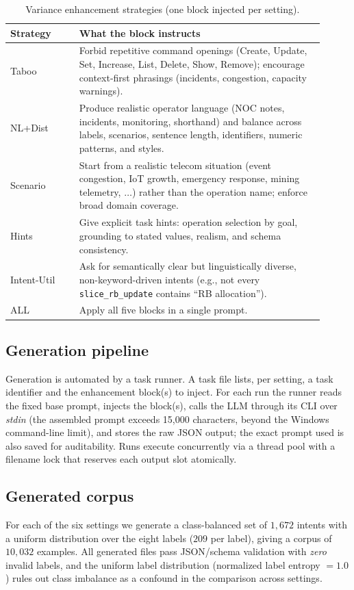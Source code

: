 \documentclass[conference]{IEEEtran}
\begin{document}
\begin{table}[t]
\centering
\small
\caption{Variance enhancement strategies (one block injected per setting).}
\label{tab:settings}
\begin{tabular}{p{0.20\linewidth} p{0.71\linewidth}}
\toprule
\textbf{Strategy} & \textbf{What the block instructs} \\
\midrule
Taboo & Forbid repetitive command openings (Create, Update, Set, Increase, List, Delete, Show, Remove); encourage context-first phrasings (incidents, congestion, capacity warnings). \\
\addlinespace
NL+Dist & Produce realistic operator language (NOC notes, incidents, monitoring, shorthand) and balance across labels, scenarios, sentence length, identifiers, numeric patterns, and styles. \\
\addlinespace
Scenario & Start from a realistic telecom situation (event congestion, IoT growth, emergency response, mining telemetry, $\dots$) rather than the operation name; enforce broad domain coverage. \\
\addlinespace
Hints & Give explicit task hints: operation selection by goal, grounding to stated values, realism, and schema consistency. \\
\addlinespace
Intent-Util & Ask for semantically clear but linguistically diverse, non-keyword-driven intents (e.g., not every \texttt{slice\_rb\_update} contains ``RB allocation''). \\
\addlinespace
ALL & Apply all five blocks in a single prompt. \\
\bottomrule
\end{tabular}
\end{table}

\subsection{Generation pipeline}
Generation is automated by a task runner. A task file lists, per setting, a task identifier and the enhancement block(s) to inject. For each run the runner reads the fixed base prompt, injects the block(s), calls the LLM through its CLI over \emph{stdin} (the assembled prompt exceeds 15{,}000 characters, beyond the Windows command-line limit), and stores the raw JSON output; the exact prompt used is also saved for auditability. Runs execute concurrently via a thread pool with a filename lock that reserves each output slot atomically.

\subsection{Generated corpus}
For each of the six settings we generate a class-balanced set of $1{,}672$ intents with a uniform distribution over the eight labels ($209$ per label), giving a corpus of $10{,}032$ examples. All generated files pass JSON/schema validation with \emph{zero} invalid labels, and the uniform label distribution (normalized label entropy $=1.0$) rules out class imbalance as a confound in the comparison across settings.
\end{document}
